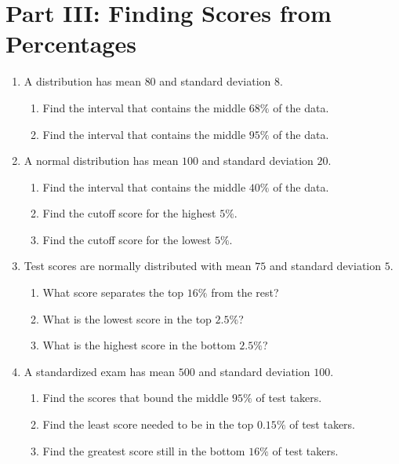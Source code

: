 \documentclass[11pt]{article}
\newcommand{\answerline}{\vspace{1.2cm}}
\begin{document}
\section{Part III: Finding Scores from Percentages}

\begin{enumerate}[leftmargin=*, label=\textbf{\arabic*.}, start=8]

\item A distribution has mean $80$ and standard deviation $8$.
\begin{enumerate}[label=(\alph*)]
    \item Find the interval that contains the middle $68\%$ of the data. \answerline
    \item Find the interval that contains the middle $95\%$ of the data. \answerline
\end{enumerate}

\item A normal distribution has mean $100$ and standard deviation $20$.
\begin{enumerate}[label=(\alph*)]
    \item Find the interval that contains the middle $40\%$ of the data. \answerline
    \item Find the cutoff score for the highest $5\%$. \answerline
    \item Find the cutoff score for the lowest $5\%$. \answerline
\end{enumerate}

\item Test scores are normally distributed with mean $75$ and standard deviation $5$.
\begin{enumerate}[label=(\alph*)]
    \item What score separates the top $16\%$ from the rest? \answerline
    \item What is the lowest score in the top $2.5\%$? \answerline
    \item What is the highest score in the bottom $2.5\%$? \answerline
\end{enumerate}

\item A standardized exam has mean $500$ and standard deviation $100$.
\begin{enumerate}[label=(\alph*)]
    \item Find the scores that bound the middle $95\%$ of test takers. \answerline
    \item Find the least score needed to be in the top $0.15\%$ of test takers. \answerline
    \item Find the greatest score still in the bottom $16\%$ of test takers. \answerline
\end{enumerate}

\end{enumerate}
\end{document}
